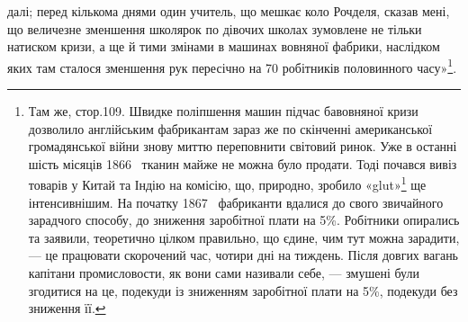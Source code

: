 далі; перед кількома днями один учитель, що мешкає коло Рочделя,
сказав мені, що величезне зменшення школярок по дівочих школах
зумовлене не тільки натиском кризи, а ще й тими змінами
в машинах вовняної фабрики, наслідком яких там сталося зменшення
рук пересічно на 70 робітників половинного часу»\footnote{
Там же, стор.109. Швидке поліпшення машин підчас бавовняної
кризи дозволило англійським фабрикантам зараз же по скінченні американської
громадянської війни знову миттю переповнити світовий ринок.
Уже в останні шість місяців 1866~ тканин майже не можна було продати.
Тоді почався вивіз товарів у Китай та Індію на комісію, що, природно,
зробило «glut»\footnote*{
— пересичення ринку. \emph{Ред.}
} ще інтенсивнішим. На початку 1867~ фабриканти вдалися
до свого звичайного зарадчого способу, до зниження заробітної
плати на 5\%. Робітники опирались та заявили, теоретично цілком правильно,
що єдине, чим тут можна зарадити, — це працювати скорочений
час, чотири дні на тиждень. Після довгих вагань капітани промисловости,
як вони сами називали себе, — змушені були згодитися на це, подекуди
із зниженням заробітної плати на 5\%, подекуди без зниження її.
}.
